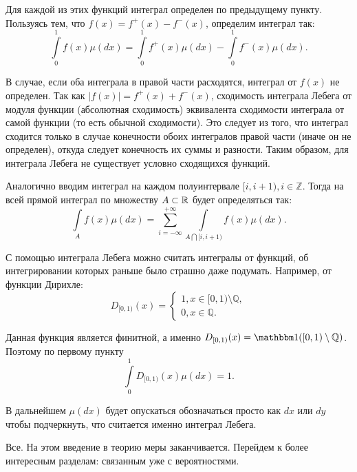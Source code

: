 \documentclass[../TV&MS.tex]{subfiles}
\begin{document}
\begin{itemize}
	Для каждой из этих функций интеграл определен по предыдущему пункту. 
	Пользуясь тем, что $f(x) = f^+(x) - f^-(x)$, определим интеграл так:
	$$  
		\int\limits_0^1 f(x) \mu(dx) =  \int\limits_0^1 f^+(x) \mu(dx) - 
		\int\limits_0^1 f^-(x) \mu(dx). 
	$$

	В случае, если оба интеграла в правой части расходятся, интеграл от $f(x)$ не 
	определен. Так как $|f(x)| = f^+(x) + f^-(x)$, сходимость интеграла Лебега от 
	модуля функции (абсолютная сходимость) эквивалента сходимости интеграла от самой 
	функции (то есть обычной сходимости). Это следует из того, что интеграл сходится 
	только в случае конечности обоих интегралов правой части (иначе он не определен), 
	откуда следует конечность их суммы и разности. Таким образом, для интеграла 
	Лебега не существует условно сходящихся функций.
\end{itemize}

Аналогично вводим интеграл на каждом полуинтервале $[i, i+1), i \in \mathbb{Z}$. 
Тогда на всей прямой интеграл по множеству $A \subset \mathbb{R}$ будет определяться так:
$$ 
	\int\limits_A f(x) \mu(dx) = \sum\limits_{i=-\infty}^{+\infty} 
	\int\limits_{A \bigcap [i, i+1)} f(x) \mu(dx). 
$$
	
\begin{Ex}
	С помощью интеграла Лебега можно считать интегралы от функций, об интегрировании 
	которых раньше было страшно даже подумать. Например, от функции Дирихле:
  	\[
  		D_{[0,1)}(x) = 
  		\begin{cases}
  			1, x \in [0,1) \setminus \mathbb{Q}, \\
  			0, x \in \mathbb{Q}.
  		\end{cases}
  	\]
  	
	Данная функция является финитной, а именно $D_{[0,1)}(x) = \Ind([0,1) 
	\setminus \mathbb{Q})$. Поэтому по первому пункту
 	$$ 
 		\int\limits_0^1 D_{[0,1)}(x) \mu(dx) = 1. 
 	$$
\end{Ex}

В дальнейшем $\mu(dx)$ будет опускаться обозначаться просто как $dx$ или 
$dy$ чтобы подчеркнуть, что считается именно интеграл Лебега.

Все. На этом введение в теорию меры заканчивается. Перейдем к более 
интересным разделам: связанным уже с вероятностями.

\newpage
\end{document}
